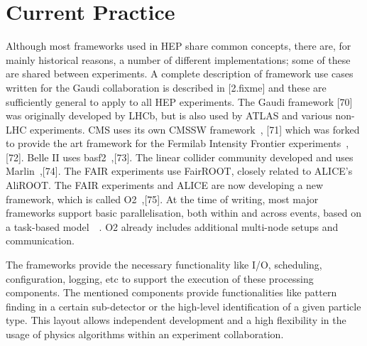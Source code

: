 \documentclass[12pt,a4paper]{article}
\begin{document}
\section{Current Practice}
\label{sec:current-practice}

Although most frameworks used in HEP share common concepts, there are,
for mainly historical reasons, a number of different implementations;
some of these are shared between experiments. A complete description
of framework use cases written for the Gaudi collaboration is
described in {[}2.fixme{]} and these are sufficiently general to apply
to all HEP experiments. The Gaudi framework {[}70{]} was originally
developed by LHCb, but is also used by ATLAS and various non-LHC
experiments. CMS uses its own CMSSW framework~\cite{Bayatian:2006nff},
{[}71{]} which was forked to provide the art framework for the Fermilab
Intensity Frontier experiments~\cite{Green:2012gv},{[}72{]}.  Belle II uses
basf2~\cite{1742-6596-331-3-032024},{[}73{]}. The linear collider community
developed and uses Marlin~\cite{Gaede:2006pj},{[}74{]}. The FAIR experiments
use FairROOT, closely related to ALICE's AliROOT. The FAIR experiments
and ALICE are now developing a new framework, which is called
O2~\cite{O2},{[}75{]}. At the time of writing, most major frameworks support
basic parallelisation, both within and across events, based on a
task-based model~\cite{Jones:2015soc}~\cite{Clemencic:2015paa}. O2 already 
includes additional multi-node setups and communication.

The frameworks provide the necessary functionality like I/O,
scheduling, configuration, logging, etc to support the execution of
these processing components. The mentioned components provide
functionalities like pattern finding in a certain sub-detector or the
high-level identification of a given particle type. This layout allows
independent development and a high flexibility in the usage of physics
algorithms within an experiment collaboration.
\end{document}
